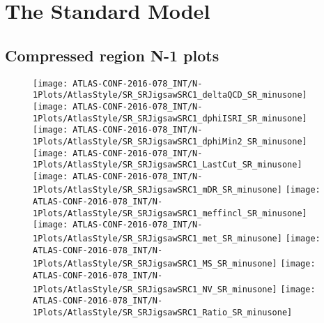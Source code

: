 

\chapter[Additional N-1 plots][Top of Page Title]{The Standard Model}
\label{app:n-1_plots}


\section{Compressed region N-1 plots}

\begin{figure}[tbph]
\begin{center}
\texttt{[image: ATLAS-CONF-2016-078\_INT/N-1Plots/AtlasStyle/SR\_SRJigsawSRC1\_deltaQCD\_SR\_minusone]}
\texttt{[image: ATLAS-CONF-2016-078\_INT/N-1Plots/AtlasStyle/SR\_SRJigsawSRC1\_dphiISRI\_SR\_minusone]}
\texttt{[image: ATLAS-CONF-2016-078\_INT/N-1Plots/AtlasStyle/SR\_SRJigsawSRC1\_dphiMin2\_SR\_minusone]}
\texttt{[image: ATLAS-CONF-2016-078\_INT/N-1Plots/AtlasStyle/SR\_SRJigsawSRC1\_LastCut\_SR\_minusone]}
\texttt{[image: ATLAS-CONF-2016-078\_INT/N-1Plots/AtlasStyle/SR\_SRJigsawSRC1\_mDR\_SR\_minusone]}
\texttt{[image: ATLAS-CONF-2016-078\_INT/N-1Plots/AtlasStyle/SR\_SRJigsawSRC1\_meffincl\_SR\_minusone]}
\texttt{[image: ATLAS-CONF-2016-078\_INT/N-1Plots/AtlasStyle/SR\_SRJigsawSRC1\_met\_SR\_minusone]}
\texttt{[image: ATLAS-CONF-2016-078\_INT/N-1Plots/AtlasStyle/SR\_SRJigsawSRC1\_MS\_SR\_minusone]}
\texttt{[image: ATLAS-CONF-2016-078\_INT/N-1Plots/AtlasStyle/SR\_SRJigsawSRC1\_NV\_SR\_minusone]}
\texttt{[image: ATLAS-CONF-2016-078\_INT/N-1Plots/AtlasStyle/SR\_SRJigsawSRC1\_Ratio\_SR\_minusone]}
\end{center}
\caption{}
\label{fig:SR_SRJigsawSRC1_deltaQCD_SR_minusone}
\end{figure}

